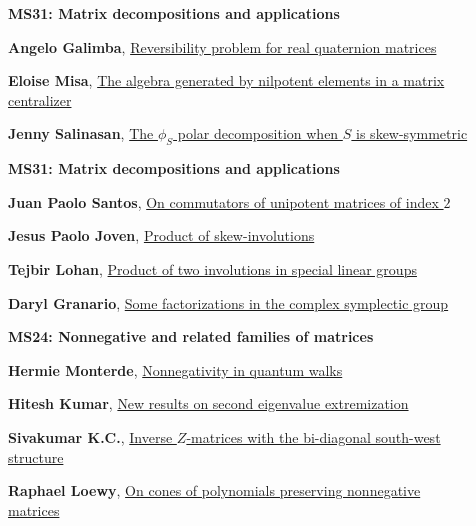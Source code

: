 \documentclass[ILAS2025-program.tex]{subfiles}
\begin{document}
        \begin{description}
    \item[] {\color{mstitle}\textbf{MS31: Matrix decompositions and applications}} 
    \item[] \hypertarget{up0274}{}\textbf{Angelo Galimba}, \hyperlink{down0274}{Reversibility problem for real quaternion matrices}
        \item[] \hypertarget{up0275}{}\textbf{Eloise Misa}, \hyperlink{down0275}{The algebra generated by nilpotent elements in a matrix centralizer}
        \item[] \hypertarget{up0276}{}\textbf{Jenny Salinasan}, \hyperlink{down0276}{The $\phi_S$ polar decomposition when $S$ is skew-symmetric}
        \end{description}
    \begin{description}
    \item[] {\color{mstitle}\textbf{MS31: Matrix decompositions and applications}} 
    \item[] \hypertarget{up0307}{}\textbf{Juan Paolo Santos}, \hyperlink{down0307}{On commutators of unipotent matrices of index $2$}
        \item[] \hypertarget{up0308}{}\textbf{Jesus Paolo Joven}, \hyperlink{down0308}{Product of skew-involutions}
        \item[] \hypertarget{up0309}{}\textbf{Tejbir Lohan}, \hyperlink{down0309}{Product of two involutions in special linear groups}
        \item[] \hypertarget{up0310}{}\textbf{Daryl Granario}, \hyperlink{down0310}{Some factorizations in the complex symplectic group}
        \end{description}
    \begin{description}
    \item[] {\color{mstitle}\textbf{MS24: Nonnegative and related families of matrices}} 
    \item[] \hypertarget{up0351}{}\textbf{Hermie Monterde}, \hyperlink{down0351}{Nonnegativity in quantum walks
}
        \item[] \hypertarget{up0352}{}\textbf{Hitesh Kumar}, \hyperlink{down0352}{New results on second eigenvalue extremization}
        \item[] \hypertarget{up0353}{}\textbf{Sivakumar K.C.}, \hyperlink{down0353}{Inverse $Z$-matrices with the bi-diagonal south-west structure
}
        \item[] \hypertarget{up0354}{}\textbf{Raphael Loewy}, \hyperlink{down0354}{On cones of polynomials preserving nonnegative matrices}
        \end{description}
    \newpage
\end{document}
